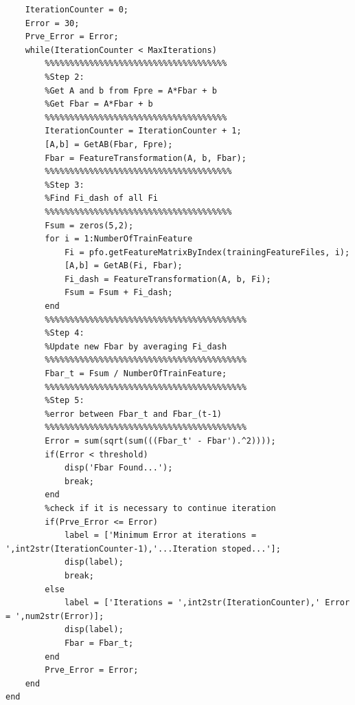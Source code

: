 \documentclass[]{article}
\begin{document}
\begin{verbatim}
    IterationCounter = 0;
    Error = 30;
    Prve_Error = Error;
    while(IterationCounter < MaxIterations)
        %%%%%%%%%%%%%%%%%%%%%%%%%%%%%%%%%%%%%
        %Step 2:
        %Get A and b from Fpre = A*Fbar + b
        %Get Fbar = A*Fbar + b
        %%%%%%%%%%%%%%%%%%%%%%%%%%%%%%%%%%%%%
        IterationCounter = IterationCounter + 1;
        [A,b] = GetAB(Fbar, Fpre);
        Fbar = FeatureTransformation(A, b, Fbar);
        %%%%%%%%%%%%%%%%%%%%%%%%%%%%%%%%%%%%%%
        %Step 3:
        %Find Fi_dash of all Fi
        %%%%%%%%%%%%%%%%%%%%%%%%%%%%%%%%%%%%%%
        Fsum = zeros(5,2);
        for i = 1:NumberOfTrainFeature
            Fi = pfo.getFeatureMatrixByIndex(trainingFeatureFiles, i);
            [A,b] = GetAB(Fi, Fbar);
            Fi_dash = FeatureTransformation(A, b, Fi);
            Fsum = Fsum + Fi_dash;
        end
        %%%%%%%%%%%%%%%%%%%%%%%%%%%%%%%%%%%%%%%%%
        %Step 4:
        %Update new Fbar by averaging Fi_dash
        %%%%%%%%%%%%%%%%%%%%%%%%%%%%%%%%%%%%%%%%%
        Fbar_t = Fsum / NumberOfTrainFeature;
        %%%%%%%%%%%%%%%%%%%%%%%%%%%%%%%%%%%%%%%%%
        %Step 5:
        %error between Fbar_t and Fbar_(t-1)
        %%%%%%%%%%%%%%%%%%%%%%%%%%%%%%%%%%%%%%%%%
        Error = sum(sqrt(sum(((Fbar_t' - Fbar').^2))));
        if(Error < threshold)
            disp('Fbar Found...');
            break;
        end
        %check if it is necessary to continue iteration
        if(Prve_Error <= Error) 
            label = ['Minimum Error at iterations = ',int2str(IterationCounter-1),'...Iteration stoped...'];
            disp(label);
            break;
        else
            label = ['Iterations = ',int2str(IterationCounter),' Error = ',num2str(Error)];
            disp(label);
            Fbar = Fbar_t;
        end
        Prve_Error = Error;
    end
end
\end{verbatim}
\end{document}
